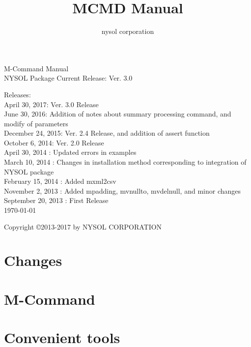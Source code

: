 \documentclass[a4paper]{book}
\title{MCMD Manual}
\author{nysol corporation}
\date{}
\begin{document}
 
\begin{titlepage}
\begin{center}
{\huge M-Command Manual}\\
\vspace{10truept}
{\normalsize NYSOL Package Current Release: Ver. 3.0}\\
\vspace{1cm}

Releases:\\
April 30, 2017: Ver. 3.0 Release\\
June 30, 2016: Addition of notes about summary processing command, and modify of parameters\\
December 24, 2015:  Ver. 2.4 Release, and addition of assert function\\
October 6, 2014:  Ver. 2.0 Release\\
April 30, 2014 : Updated errors in examples\\
March 10, 2014 : Changes in installation method corresponding to integration of NYSOL package\\
February 15, 2014 : Added mxml2csv\\
November 2, 2013 :  Added mpadding, mvnullto, mvdelnull, and minor changes\\
September 20, 2013 : First Release\\
\vspace{13cm}
{\small \today}

{\small Copyright \copyright 2013-2017 by NYSOL CORPORATION}

\end{center}
\end{titlepage}

\setcounter{tocdepth}{1}
\label{mcmd:toc}
\tableofcontents

\chapter{Changes}

\chapter{M-Command}











\chapter{Convenient tools}
\end{document}
